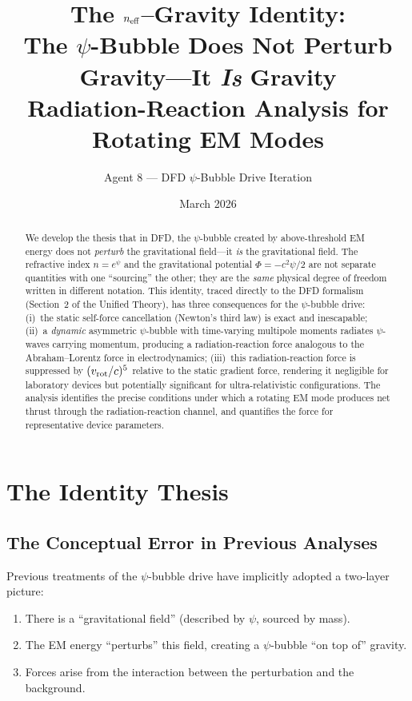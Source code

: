\documentclass[11pt]{article}
\title{The $n_{\rm eff}$--Gravity Identity:\\
The $\psi$-Bubble Does Not Perturb Gravity---It \emph{Is} Gravity\\[6pt]
\large Radiation-Reaction Analysis for Rotating EM Modes}
\author{Agent 8 --- DFD $\psi$-Bubble Drive Iteration}
\date{March 2026}
\begin{document}
\maketitle

\begin{abstract}
We develop the thesis that in DFD, the $\psi$-bubble created by
above-threshold EM energy does not \emph{perturb} the gravitational
field---it \emph{is} the gravitational field. The refractive index
$n = e^\psi$ and the gravitational potential $\Phi = -c^2\psi/2$ are not
separate quantities with one ``sourcing'' the other; they are the
\emph{same} physical degree of freedom written in different notation.
This identity, traced directly to the DFD formalism (Section~2 of the
Unified Theory), has three consequences for the $\psi$-bubble drive:
(i)~the static self-force cancellation (Newton's third law) is exact and
inescapable; (ii)~a \emph{dynamic} asymmetric $\psi$-bubble with
time-varying multipole moments radiates $\psi$-waves carrying momentum,
producing a radiation-reaction force analogous to the Abraham--Lorentz
force in electrodynamics; (iii)~this radiation-reaction force is
suppressed by $(v_{\rm rot}/c)^5$ relative to the static gradient force,
rendering it negligible for laboratory devices but potentially significant
for ultra-relativistic configurations. The analysis identifies the
precise conditions under which a rotating EM mode produces net thrust
through the radiation-reaction channel, and quantifies the force for
representative device parameters.
\end{abstract}

\tableofcontents

\section{The Identity Thesis}\label{sec:identity}

\subsection{The Conceptual Error in Previous Analyses}

Previous treatments of the $\psi$-bubble drive have implicitly adopted a
two-layer picture:
\begin{enumerate}
\item There is a ``gravitational field'' (described by $\psi$, sourced by mass).
\item The EM energy ``perturbs'' this field, creating a $\psi$-bubble
  ``on top of'' gravity.
\item Forces arise from the interaction between the perturbation and the
  background.
\end{enumerate}
\end{document}
